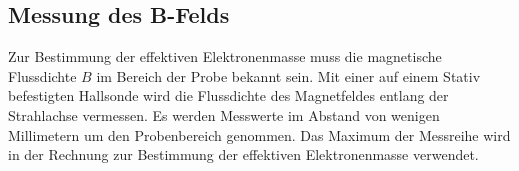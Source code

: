 \subsection{Messung des \textbf{B}-Felds}
\label{subsec:Messung des B-Felds}
Zur Bestimmung der effektiven Elektronenmasse muss die magnetische Flussdichte $B$ im Bereich der Probe bekannt sein. Mit einer auf einem Stativ befestigten Hallsonde 
wird die Flussdichte des Magnetfeldes entlang der Strahlachse vermessen. Es werden Messwerte im Abstand von wenigen Millimetern um den Probenbereich genommen. 
Das Maximum der Messreihe wird in der Rechnung zur Bestimmung der effektiven Elektronenmasse verwendet.
